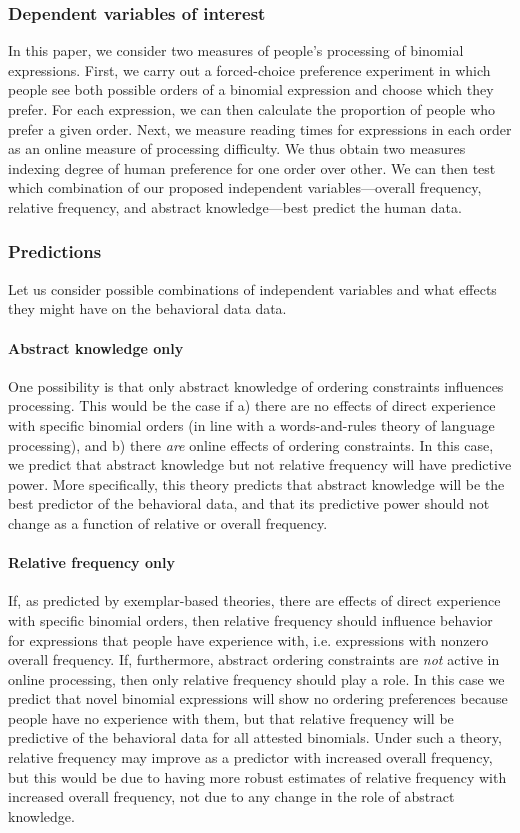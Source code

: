 \documentclass[authoryear]{elsarticle}
\begin{document}
\subsubsection{Dependent variables of interest}

In this paper, we consider two measures of people's processing of binomial expressions. First, we carry out a forced-choice preference experiment in which people see both possible orders of a binomial expression and choose which they prefer. For each expression, we can then calculate the proportion of people who prefer a given order. Next, we measure reading times for expressions in each order as an online measure of processing difficulty. We thus obtain two measures indexing degree of human preference for one order over other. We can then test which combination of our proposed independent variables---overall frequency, relative frequency, and abstract knowledge---best predict the human data.

\subsubsection{Predictions}\label{predictions}
Let us consider possible combinations of independent variables and what effects they might have on the behavioral data data.

\paragraph{Abstract knowledge only}
One possibility is that only abstract knowledge of ordering constraints influences processing. This would be the case if a) there are no effects of direct experience with specific binomial orders (in line with a words-and-rules theory of language processing), and b) there \emph{are} online effects of ordering constraints. In this case, we predict that abstract knowledge but not relative frequency will have predictive power. More specifically, this theory predicts that abstract knowledge will be the best predictor of the behavioral data, and that its predictive power should not change as a function of relative or overall frequency.

\paragraph{Relative frequency only}
If, as predicted by exemplar-based theories, there are effects of direct experience with specific binomial orders, then relative frequency should influence behavior for expressions that people have experience with, i.e. expressions with nonzero overall frequency. If, furthermore, abstract ordering constraints are \emph{not} active in online processing, then only relative frequency should play a role. In this case we predict that novel binomial expressions will show no ordering preferences because people have no experience with them, but that relative frequency will be predictive of the behavioral data for all attested binomials. Under such a theory, relative frequency may improve as a predictor with increased overall frequency, but this would be due to having more robust estimates of relative frequency with increased overall frequency, not due to any change in the role of abstract knowledge.
\end{document}
